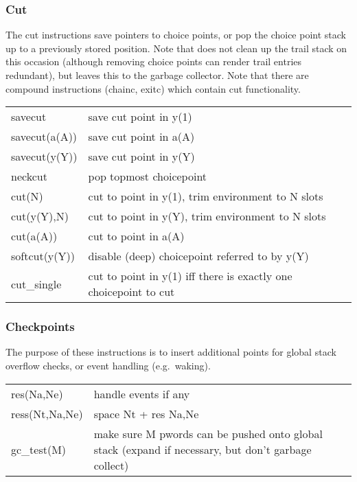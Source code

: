 \subsubsection{Cut}
The cut instructions save pointers to choice points, or pop the choice point
stack up to a previously stored position. Note that {\eclipse} does not
clean up the trail stack on this occasion (although removing choice points
can render trail entries redundant), but leaves this to the garbage collector.
Note that there are compound instructions (chainc, exitc) which contain
cut functionality.

\begin{tabular}{|p{}|p{}|}
\hline
savecut         & save cut point in y(1) \\
savecut(a(A))   & save cut point in a(A) \\
savecut(y(Y))   & save cut point in y(Y) \\
neckcut         & pop topmost choicepoint \\
cut(N)          & cut to point in y(1), trim environment to N slots \\
cut(y(Y),N)     & cut to point in y(Y), trim environment to N slots \\
cut(a(A))       & cut to point in a(A) \\
softcut(y(Y))   & disable (deep) choicepoint referred to by y(Y) \\
cut_single      & cut to point in y(1) iff there is exactly one choicepoint to cut \\
\hline
\end{tabular}


\subsubsection{Checkpoints}
The purpose of these instructions is to insert additional points for global
stack overflow checks, or event handling (e.g.\ waking).

\begin{tabular}{|p{}|p{}|}
\hline
res(Na,Ne)      & handle events if any \\
ress(Nt,Na,Ne)  & space Nt + res Na,Ne \\
gc_test(M)      & make sure M pwords can be pushed onto global stack
                 (expand if necessary, but don't garbage collect)\\
\hline
\end{tabular}

